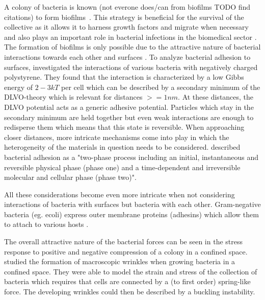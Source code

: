 \documentclass{article}
\begin{document}
A colony of bacteria is known (not everone does/can from biofilms TODO find citations) to form biofilms~\cite{Dunne2002}.
This strategy is beneficial for the survival of the collective as it allows it to harness growth factors and migrate when necessary and also plays an important role in bacterial infections in the biomedical sector \cite{Ong1999}.
The formation of biofilms is only possible due to the attractive nature of bacterial interactions towards each other and surfaces \cite{Berne2018}.
To analyze bacterial adhesion to surfaces, \cite{vanLoosdrecht1989} investigated the interactions of various bacteria with negatively charged polystyrene.
They found that the interaction is characterized by a low Gibbs energy of $2-3kT$ per cell which can be described by a secondary minimum of the DLVO-theory \cite{Derjaguin1993,Verwey1947} which is relevant for distances $>=1nm$.
At these distances, the DLVO potential acts as a generic adhesive potential.
Particles which stay in the secondary minimum are held together but even weak interactions are enough to redisperse them which means that this state is reversible.
When approaching closer distances, more intricate mechanisms come into play in which the heterogeneity of the materials in question needs to be considered.
\cite{Hori2010} described bacterial adhesion as a "two-phase process including an initial, instantaneous and reversible physical phase (phase one) and a time-dependent and irreversible molecular and cellular phase (phase two)".

All these considerations become even more intricate when not considering interactions of bacteria with surfaces but bacteria with each other. Gram-negative bacteria (eg. \ac{ecoli}) express outer membrane proteins (adhesins) which allow them to attach to various hosts \cite{Vaca2019,Beachey1981}.


The overall attractive nature of the bacterial forces can be seen in the stress response to positive and negative compression of a colony in a confined space.
\cite{Trejo2013} studied the formation of macroscopic wrinkles when growing bacteria in a confined space.
They were able to model the strain and stress of the collection of bacteria which requires that cells are connected by a (to first order) spring-like force.
The developing wrinkles could then be described by a buckling instability.
\end{document}
